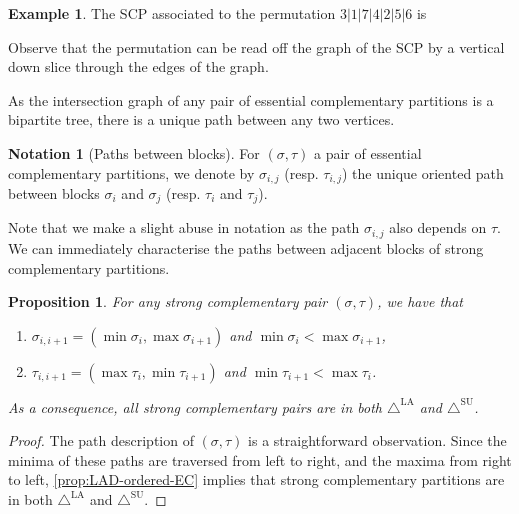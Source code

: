 \documentclass{amsart}
\newtheorem{proposition}[theorem]{Proposition}
\theoremstyle{definition}
\newtheorem{example}[theorem]{Example}
\newtheorem{notation}[theorem]{Notation}
\newcommand{\SUD}{\triangle^{\mathrm{SU}}}
\newcommand{\LAD}{\triangle^{\mathrm{LA}}}
\begin{document}
\begin{example}
\label{ex:strong-complementary}
The SCP associated to the permutation $3|1|7|4|2|5|6$ is
\begin{center}
\end{center}
Observe that the permutation can be read off the graph of the SCP by a vertical down slice through the edges of the graph.
\end{example}

As the intersection graph of any pair of essential complementary partitions is a bipartite tree, there is a unique path between any two vertices. 

\begin{notation}[Paths between blocks]
    For $(\sigma,\tau)$ a pair of essential complementary partitions, we denote by $\sigma_{i,j}$ (resp. $\tau_{i,j}$) the unique oriented path between blocks $\sigma_{i}$ and $\sigma_j$ (resp. $\tau_{i}$ and $\tau_j$).
\end{notation}
Note that we make a slight abuse in notation as the path $\sigma_{i,j}$ also depends on $\tau$.
We can immediately characterise the paths between adjacent blocks of strong complementary partitions.

\begin{proposition} 
\label{lem:SCP-path-desc}
For any strong complementary pair $(\sigma,\tau)$, we have that
\begin{enumerate}
    \item $ \sigma_{i,i+1} = ( \min \sigma_i, \max \sigma_{i+1} )$ and $\min \sigma_i< \max \sigma_{i+1}$, 
    \item $  \tau_{i,i+1} =  ( \max \tau_i, \min \tau_{i+1} )$ and $\min \tau_{i+1}< \max \tau_{i}$.
\end{enumerate}
As a consequence, all strong complementary pairs are in both $\LAD$ and $\SUD$.
\end{proposition}
\begin{proof}
The path description of $(\sigma,\tau)$ is a straightforward observation. 
Since the minima of these paths are traversed from left to right, and the maxima from right to left, \cref{prop:LAD-ordered-EC} implies that strong complementary partitions are in both $\LAD$ and $\SUD$.
\end{proof}
\end{document}

